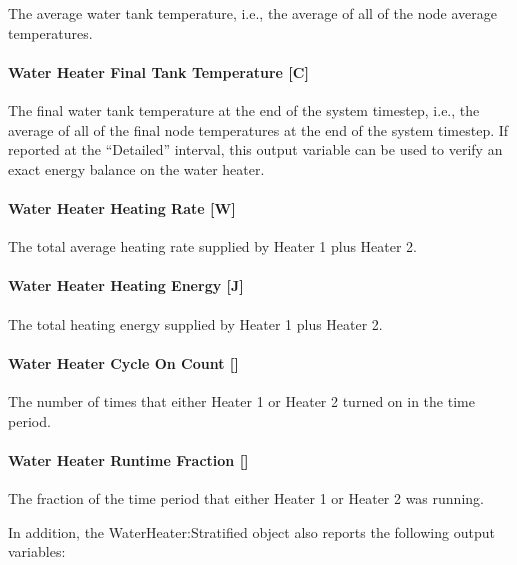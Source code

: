 The average water tank temperature, i.e., the average of all of the node average temperatures.

\paragraph{Water Heater Final Tank Temperature {[}C{]}}\label{water-heater-final-tank-temperature-c-1}

The final water tank temperature at the end of the system timestep, i.e., the average of all of the final node temperatures at the end of the system timestep. If reported at the ``Detailed'' interval, this output variable can be used to verify an exact energy balance on the water heater.

\paragraph{Water Heater Heating Rate {[}W{]}}\label{water-heater-heating-rate-w-1}

The total average heating rate supplied by Heater 1 plus Heater 2.

\paragraph{Water Heater Heating Energy {[}J{]}}\label{water-heater-heating-energy-j-1}

The total heating energy supplied by Heater 1 plus Heater 2.

\paragraph{Water Heater Cycle On Count {[]}}\label{water-heater-cycle-on-count-1}

The number of times that either Heater 1 or Heater 2 turned on in the time period.

\paragraph{Water Heater Runtime Fraction {[]}}\label{water-heater-runtime-fraction-1}

The fraction of the time period that either Heater 1 or Heater 2 was running.

In addition, the WaterHeater:Stratified object also reports the following output variables:

